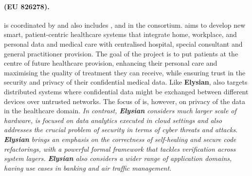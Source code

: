 \documentclass[a4paper,11pt]{article}
\newcommand{\project}[1]{\textbf{#1}\xspace}
\newcommand{\SECURITY}{\project{Elysian}}
\newcommand{\TheProject}{\SECURITY}
\begin{document}
\begin{mdframed}[backgroundcolor=blue!5]
\paragraph{\serums (EU 826278).} \serums is coordinated by \USTANshort{} and also includes \SOPRAshort{}, \IBMshort{} and \SCCHshort{} in the consortium. \serums aims to develop new smart, patient-centric healthcare systems that integrate home, workplace, and personal data and medical care with centralised hospital, special consultant and general practitioner provision. The goal of the \serums project is to put patients at the centre of future healthcare provision, enhancing their personal care and maximising the quality of treatment they can receive, while ensuring trust in the security and privacy of their confidential medical data. Like \TheProject{}, \serums also targets distributed systems where confidential data might be exchanged between different devices over untrusted networks. The focus of \serums is, however, on privacy of the data in the healthcare domain. %
\emph{In contrast, \TheProject{} considers much larger scale of hardware, is focused on data analytics executed in cloud settings and also addresses the crucial problem of security in terms of cyber threats and attacks. \TheProject{} brings an emphasis on the correctness of self-healing and secure code refactorings, with a powerful formal framework that tackles verification across system layers. \TheProject{} also considers a wider range of application domains, having use cases in banking and air traffic management.}

\end{mdframed}


\end{document}
